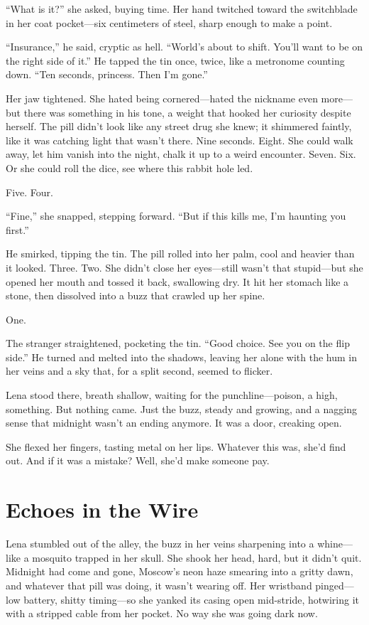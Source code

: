 \documentclass[12pt]{book}
\begin{document}
``What is it?'' she asked, buying time. Her hand twitched toward the switchblade in her coat pocket---six centimeters of steel, sharp enough to make a point.

``Insurance,'' he said, cryptic as hell. ``World's about to shift. You'll want to be on the right side of it.'' He tapped the tin once, twice, like a metronome counting down. ``Ten seconds, princess. Then I'm gone.''

Her jaw tightened. She hated being cornered---hated the nickname even more---but there was something in his tone, a weight that hooked her curiosity despite herself. The pill didn't look like any street drug she knew; it shimmered faintly, like it was catching light that wasn't there. Nine seconds. Eight. She could walk away, let him vanish into the night, chalk it up to a weird encounter. Seven. Six. Or she could roll the dice, see where this rabbit hole led.

Five. Four.

``Fine,'' she snapped, stepping forward. ``But if this kills me, I'm haunting you first.''

He smirked, tipping the tin. The pill rolled into her palm, cool and heavier than it looked. Three. Two. She didn't close her eyes---still wasn't that stupid---but she opened her mouth and tossed it back, swallowing dry. It hit her stomach like a stone, then dissolved into a buzz that crawled up her spine.

One.

The stranger straightened, pocketing the tin. ``Good choice. See you on the flip side.'' He turned and melted into the shadows, leaving her alone with the hum in her veins and a sky that, for a split second, seemed to flicker.

Lena stood there, breath shallow, waiting for the punchline---poison, a high, something. But nothing came. Just the buzz, steady and growing, and a nagging sense that midnight wasn't an ending anymore. It was a door, creaking open.

She flexed her fingers, tasting metal on her lips. Whatever this was, she'd find out. And if it was a mistake? Well, she'd make someone pay.


\chapter{Echoes in the Wire}

Lena stumbled out of the alley, the buzz in her veins sharpening into a whine---like a mosquito trapped in her skull. She shook her head, hard, but it didn’t quit. Midnight had come and gone, Moscow’s neon haze smearing into a gritty dawn, and whatever that pill was doing, it wasn’t wearing off. Her wristband pinged---low battery, shitty timing---so she yanked its casing open mid-stride, hotwiring it with a stripped cable from her pocket. No way she was going dark now.
\end{document}
